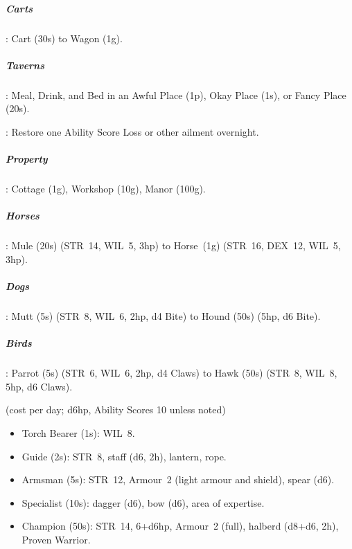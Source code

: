 \documentclass[itdr]{subfiles}
\begin{document}
\subparagraph{Carts}: Cart (30s) to Wagon (1g).

\subparagraph{Taverns}: Meal, Drink, and Bed in an Awful Place (1p), Okay Place (1s), or Fancy Place (20s).

: Restore one Ability Score Loss or other ailment overnight.

\subparagraph{Property}: Cottage (1g), Workshop (10g), Manor (100g).

\subparagraph{Horses}: Mule (20s) (STR~14, WIL~5, 3hp) to Horse~(1g) (STR~16, DEX~12, WIL~5, 3hp).

\subparagraph{Dogs}: Mutt (5s) (STR~8, WIL~6, 2hp, d4 Bite) to Hound (50s) (5hp, d6 Bite).

\subparagraph{Birds}: Parrot (5s) (STR~6, WIL~6, 2hp, d4 Claws) to Hawk (50s) (STR~8, WIL~8, 5hp, d6 Claws).

\vfill

 (cost per day; d6hp, Ability Scores 10
unless noted)
\vspace{-0.1em}
\begin{itemize}
	\item Torch Bearer (1s): WIL~8.
	\item Guide (2s): STR~8, staff (d6, 2h), lantern, rope.
	\item Armsman (5s): STR~12, Armour~2 (light armour and shield), spear (d6).
	\item Specialist (10s): dagger (d6), bow (d6), area of expertise.
	\item Champion (50s): STR~14, 6+d6hp, Armour~2 (full), halberd (d8+d6, 2h), Proven Warrior.
\end{itemize}


\end{document}
